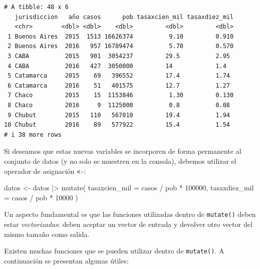 \documentclass[
  spanish,
  letterpaper,
  DIV=11,
  numbers=noendperiod]{scrreprt}
\newenvironment{Shaded}{\begin{snugshade}}{\end{snugshade}}
\newcommand{\AttributeTok}[1]{\textcolor[rgb]{0.40,0.45,0.13}{#1}}
\newcommand{\DecValTok}[1]{\textcolor[rgb]{0.68,0.00,0.00}{#1}}
\newcommand{\FunctionTok}[1]{\textcolor[rgb]{0.28,0.35,0.67}{#1}}
\newcommand{\NormalTok}[1]{\textcolor[rgb]{0.00,0.23,0.31}{#1}}
\newcommand{\OtherTok}[1]{\textcolor[rgb]{0.00,0.23,0.31}{#1}}
\newcommand{\SpecialCharTok}[1]{\textcolor[rgb]{0.37,0.37,0.37}{#1}}
\begin{document}
\begin{verbatim}
# A tibble: 48 x 6
   jurisdiccion   año casos      pob tasaxcien_mil tasaxdiez_mil
   <chr>        <dbl> <dbl>    <dbl>         <dbl>         <dbl>
 1 Buenos Aires  2015  1513 16626374          9.10         0.910
 2 Buenos Aires  2016   957 16789474          5.70         0.570
 3 CABA          2015   901  3054237         29.5          2.95 
 4 CABA          2016   427  3050000         14            1.4  
 5 Catamarca     2015    69   396552         17.4          1.74 
 6 Catamarca     2016    51   401575         12.7          1.27 
 7 Chaco         2015    15  1153846          1.30         0.130
 8 Chaco         2016     9  1125000          0.8          0.08 
 9 Chubut        2015   110   567010         19.4          1.94 
10 Chubut        2016    89   577922         15.4          1.54 
# i 38 more rows
\end{verbatim}

Si deseamos que estas nuevas variables se incorporen de forma permanente
al conjunto de datos (y no solo se muestren en la consola), debemos
utilizar el operador de asignación \texttt{\textless{}-}:

\begin{Shaded}
\begin{Highlighting}[]
\NormalTok{datos }\OtherTok{\textless{}{-}}\NormalTok{ datos }\SpecialCharTok{|\textgreater{}}
  \FunctionTok{mutate}\NormalTok{(}
    \AttributeTok{tasaxcien\_mil =}\NormalTok{ casos }\SpecialCharTok{/}\NormalTok{ pob }\SpecialCharTok{*} \DecValTok{100000}\NormalTok{,}
    \AttributeTok{tasaxdiez\_mil =}\NormalTok{ casos }\SpecialCharTok{/}\NormalTok{ pob }\SpecialCharTok{*} \DecValTok{10000}
\NormalTok{  )}
\end{Highlighting}
\end{Shaded}

Un aspecto fundamental es que las funciones utilizadas dentro de
\texttt{mutate()} deben estar \emph{vectorizadas}: deben aceptar un
vector de entrada y devolver otro vector del mismo tamaño como salida.

Existen muchas funciones que se pueden utilizar dentro de
\texttt{mutate()}. A continuación se presentan algunas útiles:
\end{document}
